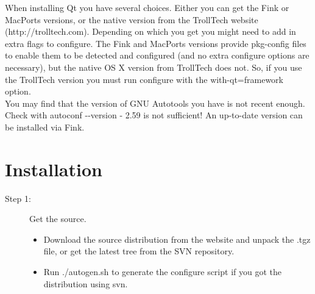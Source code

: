 When installing Qt you have several choices. Either you can get the Fink or MacPorts versions, or the native version from the TrollTech website (http://trolltech.com). Depending on which you get you might need to add in extra flags to {\sffamily configure}. The Fink and MacPorts versions provide pkg-config files to enable them to be detected and configured (and no extra {\sffamily configure} options are necessary), but the native OS X version from TrollTech does not. So, if you use the TrollTech version you must run {\sffamily configure} with the {\sffamily {-}{-}with-qt=framework} option.\\

You may find that the version of GNU Autotools you have is not recent enough. Check with {\sffamily autoconf {-}{-}version} - 2.59 is not sufficient! An up-to-date version can be installed via Fink.\\

\section{Installation}

\begin{description}
	\item[Step 1:\its] Get the source.
	\begin{itemize}
		\item Download the source distribution from the website and unpack the .tgz file, or get the latest tree from the SVN repository.
		\item Run {\sffamily ./autogen.sh} to generate the {\sffamily configure} script if you got the distribution using svn.
	\end{itemize}
\end{description}

